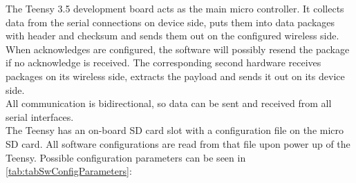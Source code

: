 %
\label{sec:txtSwConfig}
The Teensy 3.5 development board acts as the main micro controller. It collects data from the serial connections on device side, puts them into data packages with header and checksum and sends them out on the configured wireless side. When acknowledges are configured, the software will possibly resend the package if no acknowledge is received. The corresponding second hardware receives packages on its wireless side, extracts the payload and sends it out on its device side.\\
All communication is bidirectional, so data can be sent and received from all serial interfaces.\\
The Teensy has an on-board SD card slot with a configuration file on the micro SD card. All software configurations are read from that file upon power up of the Teensy. Possible configuration parameters can be seen in \autoref{tab:tabSwConfigParameters}:
%
